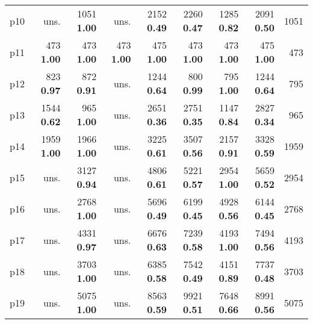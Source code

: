 \begin{tabular}{|l|rrrrrrr|r|}
p10 & uns. & {\footnotesize 1051} \textbf{1.00} & uns. & {\footnotesize 2152} \textbf{0.49} & {\footnotesize 2260} \textbf{0.47} & {\footnotesize 1285} \textbf{0.82} & {\footnotesize 2091} \textbf{0.50} & 1051\\
p11 & {\footnotesize 473} \textbf{1.00} & {\footnotesize 473} \textbf{1.00} & {\footnotesize 473} \textbf{1.00} & {\footnotesize 475} \textbf{1.00} & {\footnotesize 473} \textbf{1.00} & {\footnotesize 473} \textbf{1.00} & {\footnotesize 475} \textbf{1.00} & 473\\
p12 & {\footnotesize 823} \textbf{0.97} & {\footnotesize 872} \textbf{0.91} & uns. & {\footnotesize 1244} \textbf{0.64} & {\footnotesize 800} \textbf{0.99} & {\footnotesize 795} \textbf{1.00} & {\footnotesize 1244} \textbf{0.64} & 795\\
p13 & {\footnotesize 1544} \textbf{0.62} & {\footnotesize 965} \textbf{1.00} & uns. & {\footnotesize 2651} \textbf{0.36} & {\footnotesize 2751} \textbf{0.35} & {\footnotesize 1147} \textbf{0.84} & {\footnotesize 2827} \textbf{0.34} & 965\\
p14 & {\footnotesize 1959} \textbf{1.00} & {\footnotesize 1966} \textbf{1.00} & uns. & {\footnotesize 3225} \textbf{0.61} & {\footnotesize 3507} \textbf{0.56} & {\footnotesize 2157} \textbf{0.91} & {\footnotesize 3328} \textbf{0.59} & 1959\\
p15 & uns. & {\footnotesize 3127} \textbf{0.94} & uns. & {\footnotesize 4806} \textbf{0.61} & {\footnotesize 5221} \textbf{0.57} & {\footnotesize 2954} \textbf{1.00} & {\footnotesize 5659} \textbf{0.52} & 2954\\
p16 & uns. & {\footnotesize 2768} \textbf{1.00} & uns. & {\footnotesize 5696} \textbf{0.49} & {\footnotesize 6199} \textbf{0.45} & {\footnotesize 4928} \textbf{0.56} & {\footnotesize 6144} \textbf{0.45} & 2768\\
p17 & uns. & {\footnotesize 4331} \textbf{0.97} & uns. & {\footnotesize 6676} \textbf{0.63} & {\footnotesize 7239} \textbf{0.58} & {\footnotesize 4193} \textbf{1.00} & {\footnotesize 7494} \textbf{0.56} & 4193\\
p18 & uns. & {\footnotesize 3703} \textbf{1.00} & uns. & {\footnotesize 6385} \textbf{0.58} & {\footnotesize 7542} \textbf{0.49} & {\footnotesize 4151} \textbf{0.89} & {\footnotesize 7737} \textbf{0.48} & 3703\\
p19 & uns. & {\footnotesize 5075} \textbf{1.00} & uns. & {\footnotesize 8563} \textbf{0.59} & {\footnotesize 9921} \textbf{0.51} & {\footnotesize 7648} \textbf{0.66} & {\footnotesize 8991} \textbf{0.56} & 5075\\

\end{tabular}
